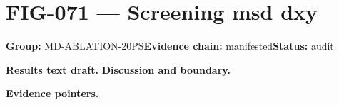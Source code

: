 \clearpage
\section{FIG-071 --- Screening msd dxy}
\label{figpage:fig-071}
\textbf{Group:} MD-ABLATION-20PS\quad \textbf{Evidence chain:} manifested\quad \textbf{Status:} audit

\textbf{Results text draft.} 
\textbf{Discussion and boundary.} 


\textbf{Evidence pointers.}



\vfill
